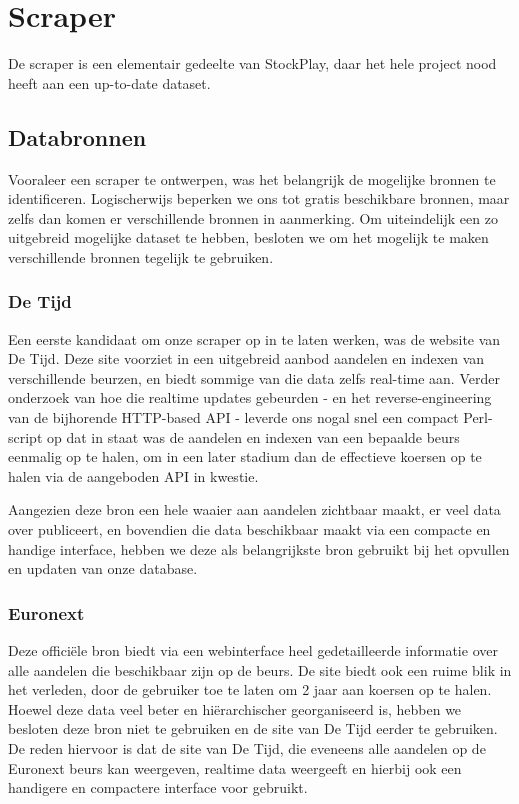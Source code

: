 %
%

\chapter{Scraper}

De scraper is een elementair gedeelte van StockPlay, daar het hele project nood heeft aan een up-to-date dataset.

\section{Databronnen}

Vooraleer een scraper te ontwerpen, was het belangrijk de mogelijke bronnen te identificeren. Logischerwijs beperken we ons tot gratis beschikbare bronnen, maar zelfs dan komen er verschillende bronnen in aanmerking. Om uiteindelijk een zo uitgebreid mogelijke dataset te hebben, besloten we om het mogelijk te maken verschillende bronnen tegelijk te gebruiken.

\subsection{De Tijd}

Een eerste kandidaat om onze scraper op in te laten werken, was de website van De Tijd. Deze site voorziet in een uitgebreid aanbod aandelen en indexen van verschillende beurzen, en biedt sommige van die data zelfs real-time aan. Verder onderzoek van hoe die realtime updates gebeurden - en het reverse-engineering van de bijhorende HTTP-based API - leverde ons nogal snel een compact Perl-script op dat in staat was de aandelen en indexen van een bepaalde beurs eenmalig op te halen, om in een later stadium dan de effectieve koersen op te halen via de aangeboden API in kwestie.

Aangezien deze bron een hele waaier aan aandelen zichtbaar maakt, er veel data over publiceert, en bovendien die data beschikbaar maakt via een compacte en handige interface, hebben we deze als belangrijkste bron gebruikt bij het opvullen en updaten van onze database.

\subsection{Euronext}

Deze offici\"ele bron biedt via een webinterface heel gedetailleerde informatie over alle aandelen die beschikbaar zijn op de beurs. De site biedt ook een ruime blik in het verleden, door de gebruiker toe te laten om 2 jaar aan koersen op te halen. Hoewel deze data veel beter en hi\"erarchischer georganiseerd is, hebben we besloten deze bron niet te gebruiken en de site van De Tijd eerder te gebruiken. De reden hiervoor is dat de site van De Tijd, die eveneens alle aandelen op de Euronext beurs kan weergeven, realtime data weergeeft en hierbij ook een handigere en compactere interface voor gebruikt.

